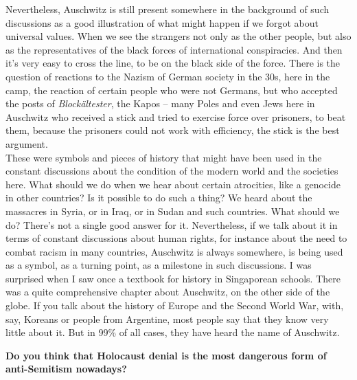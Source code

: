 Nevertheless, Auschwitz is still present somewhere in the background of such discussions as a good illustration of what might happen if we forgot about universal values. When we see the strangers not only as the other people, but also as the representatives of the black forces of international conspiracies. And then it’s very easy to cross the line, to be on the black side of the force. There is the question of reactions to the Nazism of German society in the 30s, here in the camp, the reaction of certain people who were not Germans, but who accepted the posts of \textit{Blockältester}, the Kapos – many Poles and even Jews here in Auschwitz who received a stick and tried to exercise force over prisoners, to beat them, because the prisoners could not work with efficiency, the stick is the best argument.\\ 
These were symbols and pieces of history that might have been used in the constant discussions about the condition of the modern world and the societies here. What should we do when we hear about certain atrocities, like a genocide in other countries? Is it possible to do such a thing? We heard about the massacres in Syria, or in Iraq, or in Sudan and such countries. What should we do? There’s not a single good answer for it. Nevertheless, if we talk about it in terms of constant discussions about human rights, for instance about the need to combat racism in many countries, Auschwitz is always somewhere, is being used as a symbol, as a turning point, as a milestone in such discussions. I was surprised when I saw once a textbook for history in Singaporean schools. There was a quite comprehensive chapter about Auschwitz, on the other side of the globe. If you talk about the history of Europe and the Second World War, with, say, Koreans or people from Argentine, most people say that they know very little about it. But in 99\% of all cases, they have heard the name of Auschwitz.
 
\textbf{Do you think that Holocaust denial is the most dangerous form of anti-Semitism nowadays?}

